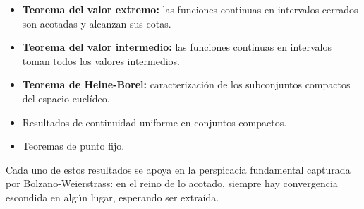 \begin{itemize}
  \item \textbf{Teorema del valor extremo:} las funciones continuas en
        intervalos cerrados son acotadas y alcanzan sus cotas.
  \item \textbf{Teorema del valor intermedio:} las funciones continuas
        en intervalos toman todos los valores intermedios.
  \item \textbf{Teorema de Heine-Borel:} caracterización de los
        subconjuntos compactos del espacio euclídeo.
  \item Resultados de continuidad uniforme en conjuntos compactos.
  \item Teoremas de punto fijo.
\end{itemize}

Cada uno de estos resultados se apoya en la perspicacia fundamental
capturada por Bolzano-Weierstrass: en el reino de lo acotado, siempre
hay convergencia escondida en algún lugar, esperando ser extraída.

